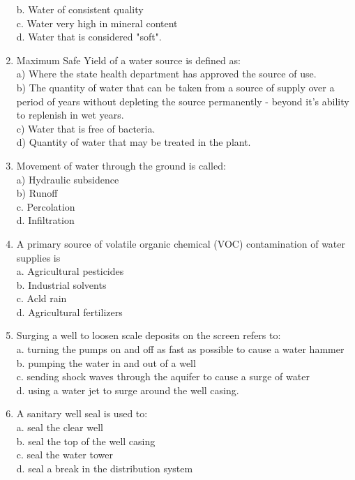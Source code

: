 \begin{enumerate}
b. Water of consistent quality\\
c. Water very high in mineral content\\
d. Water that is considered "soft".\\
\item Maximum Safe Yield of a water source is defined as:\\
a) Where the state health department has approved the source of use.\\
b) The quantity of water that can be taken from a source of supply over a period of years without depleting the source permanently - beyond it's ability to replenish in wet years.\\
c) Water that is free of bacteria.\\
d) Quantity of water that may be treated in the plant.\\
\item Movement of water through the ground is called:\\
a) Hydraulic subsidence\\
b) Runoff\\
c. Percolation\\
d. Infiltration\\
\item A primary source of volatile organic chemical (VOC) contamination of water supplies is\\
a. Agricultural pesticides\\
b. Industrial solvents\\
c. Acld rain\\
d. Agricultural fertilizers\\
\item Surging a well to loosen scale deposits on the screen refers to:\\
a. turning the pumps on and off as fast as possible to cause a water hammer\\
b. pumping the water in and out of a well\\
c. sending shock waves through the aquifer to cause a surge of water\\
d. using a water jet to surge around the well casing.\\
\item A sanitary well seal is used to:\\
a. seal the clear well\\
b. seal the top of the well casing\\
c. seal the water tower\\
d. seal a break in the distribution system\\

\end{enumerate}
